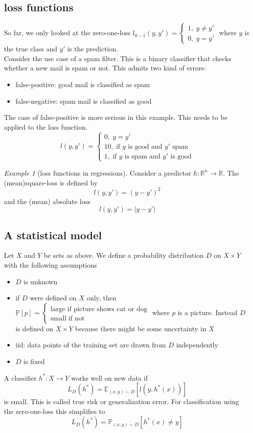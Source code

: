 \documentclass[a4paper, 12pt]{article}
\theoremstyle{plain}
\theoremstyle{definition}
\theoremstyle{lemma}
\theoremstyle{remark}
\theoremstyle{example}
\newtheorem{example}[theorem]{Example}
\begin{document}
	\subsection{loss functions}
	So far, we only looked at the zero-one-loss $l_{0-1}(y,y') = \begin{cases}
		1, \; y \neq y'\\
		0, \; y = y'
	\end{cases}$ where $y$ is the true class and $y'$ is the prediction.\\
	Consider the use case of a spam filter. This is a binary classifier that checks whether a new mail is spam or not. This admits two kind of errors: \begin{itemize}
		\item false-positive: good mail is classified as spam
		\item false-negative: spam mail is classified as good
	\end{itemize}
	The case of false-positive is more serious in this example. This needs to be applied to the loss function. \[l(y,y') = \begin{cases}
		0, \; y=y'\\
		10, \; \text{if $y$ is good and $y'$ spam}\\
		1, \; \text{if $y$ is spam and $y'$ is good}
	\end{cases}\]
	\begin{example}[loss functions in regressions]
		Consider a predictor $h: \mathbb{R}^n \to \mathbb{R}$. The (mean)square-loss is defined by \[l(y,y') = (y-y')^2\] and the (mean) absolute loss \[l(y,y') = \left|y-y'\right|\]
	\end{example}
	\subsection{A statistical model}
	Let $X$ and $Y$ be sets as above. We define a probability distribution $D$ on $X\times Y$ with the following assumptions \begin{itemize}
		\item $D$ is unknown
		\item if $D$ were defined on $X$ only, then $\mathbb{P}[p] = \begin{cases}
			\text{large if picture shows cat or dog}\\
			\text{small if not}
		\end{cases}$ where $p$ is a picture. Instead $D$ is defined on $X\times Y$ because there might be some uncertainty in $X$\\
	\item iid: data points of the training set are drawn from $D$ independently
	\item $D$ is fixed 
	\end{itemize}
	A classifier $h^*: X \to Y$ works well on new data if \[L_D(h^*) = \mathbb{E}_{(x,y)\sim D}[l(y,h^*(x))]\] is small. This is called true risk or generalization error. For classification using the zero-one-loss this simplifies to \[L_D(h^*) = \mathbb{P}_{(x,y)\sim D}[h^*(x)\neq y]\]
\end{document}
